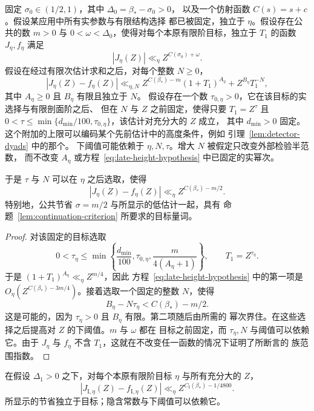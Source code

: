 \begin{lemma}[高度与外部阶的延迟选择]
\label{lem:late-height-closure}
固定 $\sigma_0\in(1/2,1)$，其中 $\Delta_0=\beta_*-\sigma_0>0$，
以及一个仿射函数 $C(s)=s+c$。假设某应用中所有实参数与有限结构选择
都已被固定，独立于 $\eta$。假设存在公共的数 $m>0$ 与
$0<\omega<\Delta_0$，使得对每个本原有限阶目标，独立于 $T_1$ 的函数
$J_\eta,f_\eta$ 满足
\[
 |J_\eta(Z)|\ll_\eta Z^{C(\sigma_0)+\omega}.
\]
假设在经过有限次估计求和之后，对每个整数 $N\ge0$，
\begin{equation}
 |J_\eta(Z)-f_\eta(Z)|
 \ll_{\eta,N} Z^{C(\beta_*)-m}(1+T_1)^{A_\eta}
       +Z^{B_\eta}T_1^{-N},
 \label{eq:late-height-hypothesis}
\end{equation}
其中 $A_\eta\ge0$ 且 $B_\eta$ 有限且独立于 $N$。
假设存在一个数 $\tau_{0,\eta}>0$，它在该目标的实选择与有限剖面阶之后、
但在 $N$ 与 $Z$ 之前固定，使得只要 $T_1=Z^\tau$ 且
$0<\tau\le\min\{d_{\min}/100,\tau_{0,\eta}\}$，该估计对充分大的 $Z$ 成立，
其中 $d_{\min}>0$ 固定。
这个附加的上限可以编码某个先前估计中的高度条件，例如
引理~\ref{lem:detector-dyads} 中的那个。
下阈值可能依赖于 $\eta,N,\tau$。增大 $N$ 被假定只改变外部检验半范数，
而不改变 $A_\eta$ 或方程~\eqref{eq:late-height-hypothesis} 中已固定的实幂次。

于是 $\tau$ 与 $N$ 可以在 $\eta$ 之后选取，使得
\[
 |J_\eta(Z)-f_\eta(Z)|\ll_\eta Z^{C(\beta_*)-m/2}.
\]
特别地，公共节省 $\sigma=m/2$ 与所显示的低估计一起，具有
命题~\ref{lem:continuation-criterion} 所要求的目标量词。
\end{lemma}

\begin{proof}
对该固定的目标选取
\[
0<\tau_\eta\le
 \min\left\{\frac{d_{\min}}{100},\tau_{0,\eta},
                 \frac{m}{4(A_\eta+1)}\right\},
 \qquad T_1=Z^{\tau_\eta}.
\]
于是 $(1+T_1)^{A_\eta}\ll_\eta Z^{m/4}$，因此
方程~\eqref{eq:late-height-hypothesis} 中的第一项是
$O_\eta(Z^{C(\beta_*)-3m/4})$。接着选取一个固定的整数 $N$，使得
\[
 B_\eta-N\tau_\eta<C(\beta_*)-m/2.
\]
这是可能的，因为 $\tau_\eta>0$ 且 $B_\eta$ 有限。第二项随后由所需的
幂次界住。在这些选择之后提高对 $Z$ 的下阈值。$m$ 与 $\omega$ 都在
目标之前固定，而 $\tau_\eta,N$ 与阈值可以依赖它。由于 $J_\eta$ 与
$f_\eta$ 不含 $T_1$，这就在不改变任一函数的情况下证明了所断言的
族范围指数。
\end{proof}

\begin{proposition}[平衡的高估计]
\label{prop:balanced-high}
在假设 $\Delta_1>0$ 之下，对每个本原有限阶目标 $\eta$ 与所有充分大的
$Z$，
\[
 |J_{\mathrm I,\eta}(Z)-f_{\mathrm I,\eta}(Z)|
 \ll_\eta Z^{C_{\mathrm I}(\beta_*)-1/4800}.
\]
所显示的节省独立于目标；隐含常数与下阈值可以依赖它。
\end{proposition}

